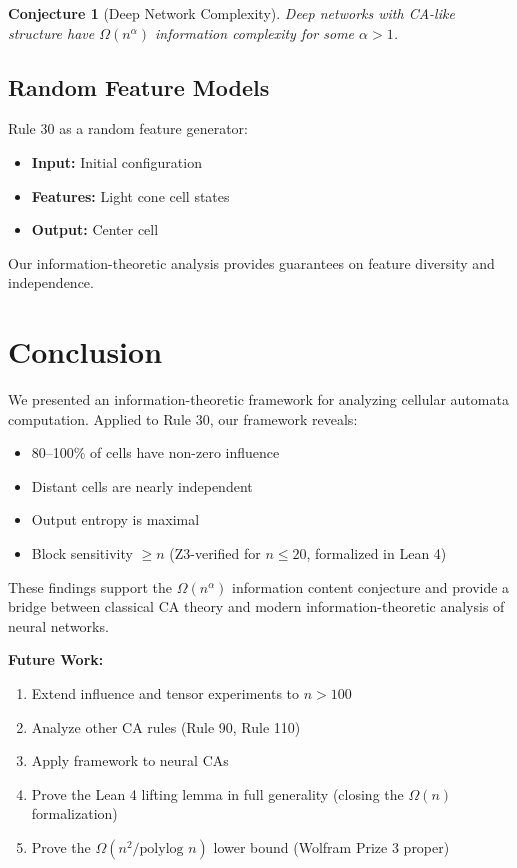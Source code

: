 \documentclass[11pt]{article}
\newtheorem{conjecture}[theorem]{Conjecture}
\begin{document}
\begin{conjecture}[Deep Network Complexity]
Deep networks with CA-like structure have $\Omega(n^\alpha)$ information complexity for some $\alpha > 1$.
\end{conjecture}

\subsection{Random Feature Models}

Rule 30 as a random feature generator:
\begin{itemize}
    \item \textbf{Input:} Initial configuration
    \item \textbf{Features:} Light cone cell states
    \item \textbf{Output:} Center cell
\end{itemize}

Our information-theoretic analysis provides guarantees on feature diversity and independence.

\section{Conclusion}

We presented an information-theoretic framework for analyzing cellular automata computation. Applied to Rule 30, our framework reveals:
\begin{itemize}
    \item 80--100\% of cells have non-zero influence
    \item Distant cells are nearly independent
    \item Output entropy is maximal
    \item Block sensitivity $\geq n$ (Z3-verified for $n \leq 20$, formalized in Lean 4)
\end{itemize}

These findings support the $\Omega(n^\alpha)$ information content conjecture and provide a bridge between classical CA theory and modern information-theoretic analysis of neural networks.

\textbf{Future Work:}
\begin{enumerate}
    \item Extend influence and tensor experiments to $n > 100$
    \item Analyze other CA rules (Rule 90, Rule 110)
    \item Apply framework to neural CAs
    \item Prove the Lean 4 lifting lemma in full generality (closing the $\Omega(n)$ formalization)
    \item Prove the $\Omega(n^2 / \text{polylog } n)$ lower bound (Wolfram Prize 3 proper)
\end{enumerate}
\end{document}

